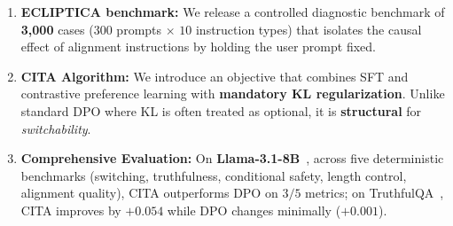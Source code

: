 \vspace{-0.35em}
\begin{enumerate}[leftmargin=*,itemsep=0em]

     \item \textbf{ECLIPTICA benchmark:} We release a controlled diagnostic benchmark of \textbf{3,000} cases ($300$ prompts $\times$ $10$ instruction types) that isolates the causal effect of alignment instructions by holding the user prompt fixed.

    \item \textbf{CITA Algorithm:} We introduce an objective that combines SFT and contrastive preference learning with \textbf{mandatory KL regularization}.
    Unlike standard DPO where KL is often treated as optional, it is \textbf{structural} for \emph{switchability}.

   

    \item \textbf{Comprehensive Evaluation:} On \textbf{Llama-3.1-8B}~\cite{dubey2024llama}, across five deterministic benchmarks (switching, truthfulness, conditional safety, length control, alignment quality), CITA outperforms DPO on $3/5$ metrics; on TruthfulQA~\cite{lin2022truthfulqa}, CITA improves by $+0.054$ while DPO changes minimally ($+0.001$).
\end{enumerate}



